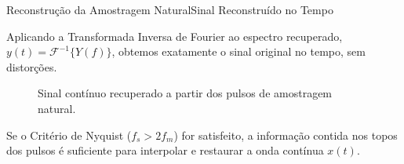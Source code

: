 \begin{frame}{Reconstrução da Amostragem Natural}{Sinal Reconstruído no Tempo}
	
	Aplicando a Transformada Inversa de Fourier ao espectro recuperado, $y(t) = \mathcal{F}^{-1}\{Y(f)\}$, obtemos exatamente o sinal original no tempo, sem distorções.
	
	\vspace{0.5em}
	
	\def\Ts{0.2}
	\def\Tau{0.05}
	\def\Nam{5}
	
	\begin{figure}
		\centering
		\caption{Sinal contínuo recuperado a partir dos pulsos de amostragem natural.}
		\label{fig: sinal_natural_reconstruido}
	\end{figure}
	
	\vspace{0.2em}
	{\small Se o Critério de Nyquist ($f_s > 2f_m$) for satisfeito, a informação contida nos topos dos pulsos é suficiente para interpolar e restaurar a onda contínua $x(t)$.}
	
\end{frame}